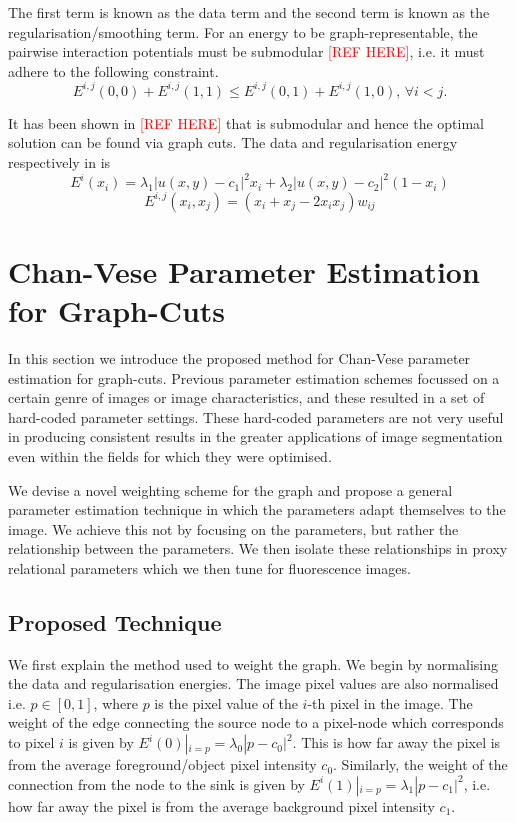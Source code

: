 \documentclass[10pt, journal, letterpaper, onecolumn, draftcls]{IEEEtran}
\begin{document}
The first term is known as the data term and the second term is known as the regularisation/smoothing term. For an energy to be graph-representable, the pairwise interaction potentials must be submodular \textcolor{red}{[REF HERE]}, i.e. it must adhere to the following constraint.
\begin{equation}
	E^{i,j}(0,0) + E^{i,j}(1,1) \leq E^{i,j}(0,1) + E^{i,j}(1,0), \, \forall i < j.
\end{equation}

It has been shown in \textcolor{red}{[REF HERE]} that  is submodular and hence the optimal solution can be found via graph cuts. The data and regularisation energy respectively in  is
\begin{equation}
	E^i(x_i) = \lambda_1 |u(x,y)-c_1|^2 x_i + \lambda_2 |u(x,y)-c_2|^2 (1-x_i)
\end{equation}
\begin{equation}
	E^{i,j}(x_i,x_j) = (x_i + x_j - 2x_ix_j)w_{ij}
\end{equation}

\section{Chan-Vese Parameter Estimation for Graph-Cuts}
\label{sec:Proptechnique}
In this section we introduce the proposed method for Chan-Vese parameter estimation for graph-cuts. Previous parameter estimation schemes focussed on a certain genre of images or image characteristics, and these resulted in a set of hard-coded parameter settings. These hard-coded parameters are not very useful in producing consistent results in the greater applications of image segmentation even within the fields for which they were optimised.

We devise a novel weighting scheme for the graph and propose a general parameter estimation technique in which the parameters adapt themselves to the image. We achieve this not by focusing on the parameters, but rather the relationship between the parameters. We then isolate these relationships in proxy relational parameters which we then tune for fluorescence images.

\subsection{Proposed Technique}
We first explain the method used to weight the graph. We begin by normalising the data and regularisation energies.
The image pixel values are also normalised i.e. $p \in [0,1]$, where $p$ is the pixel value of the $i$-th pixel in the image. The weight of the edge connecting the source node to a pixel-node which corresponds to pixel $i$ is given by  $E^i(0)|_{i=p} = \lambda_0|p-c_0|^2$. This is how far away the pixel is from the average foreground/object pixel intensity $c_0$.  Similarly, the weight of the connection from the node to the sink is given by $E^i(1)|_{i=p}=\lambda_1|p-c_1|^2$, i.e. how far away the pixel is from the average background pixel intensity $c_1$.
\end{document}
